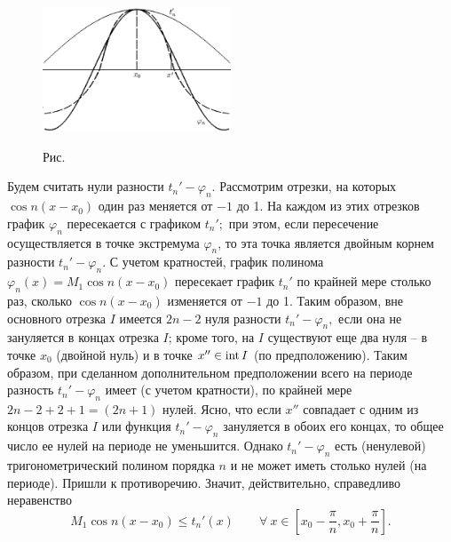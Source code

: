 \begin{figure}[ht]
\begin{center}
\includegraphics[width=0.5\textwidth]{pict/pict17-2.eps}
\end{center}
 \label{r17-2}

\centerline{Рис.~\theris}
\end{figure}


 Будем считать нули разности $t_n'-\varphi_n.$  Рассмотрим отрезки, на которых
 $\cos n(x-x_0)$ один раз
 меняется от $-1$ до 1. На каждом из этих отрезков график $\varphi_n$
 пересекается с графиком  $t_n';$
 при этом, если пересечение осуществляется  в точке экстремума $\varphi_n$, то  эта
 точка является двойным корнем разности  $t_n'-\varphi_n.$ С учетом кратностей, график
 полинома $\varphi_n(x)=M_1 \cos n(x-x_0)$
 пересекает график  $t_n'$ {по крайней мере} столько раз, сколько $\cos n(x-x_0)$
 изменяется от $-1$ до 1. Таким образом, вне основного
 отрезка $I$ имеется $2n-2$ нуля разности $t_n'-\varphi_n,$
 {если она не зануляется в концах отрезка $I$;} кроме того,  на $I$
существуют еще два нуля -- в точке $x_0$ (двойной нуль) и в точке {$x''\in {\rm int}\, I$}
 (по предположению). Таким образом, при сделанном дополнительном предположении
 всего на периоде разность $t_n'-\varphi_n$ имеет
 (с учетом кратности), по крайней мере $2n-2+2+1=(2n+1)$
 нулей. {Ясно, что если $x''$ совпадает с одним из концов отрезка $I$ или
 функция $t_n'-\varphi_n$}
 {зануляется в обоих его концах, то общее число ее нулей на периоде
 не уменьшится.}  Однако  $t_n'-\varphi_n$ есть (ненулевой)  тригонометрический
 полином порядка $n$
 и не может иметь столько нулей  (на периоде). Пришли к противоречию. Значит,
 действительно, справедливо неравенство
 $$
 M_1\cos n(x-x_0)\le t_n'(x)\qquad \forall\ x\in
 \left[ x_0-\frac{\pi}{n},x_0+\frac{\pi}{n} \right].
 $$

